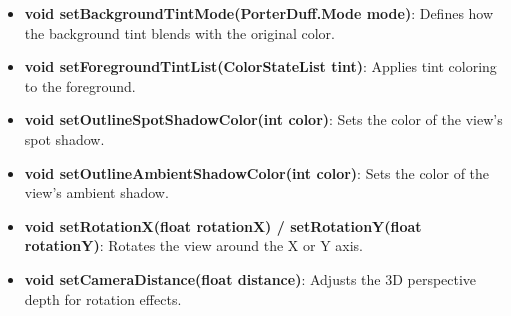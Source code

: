 \documentclass{report}
\begin{document}
\begin{itemize}
\begin{itemize}
        \item \textbf{void setBackgroundTintMode(PorterDuff.Mode mode)}: Defines how the background tint blends with the original color.
        \item \textbf{void setForegroundTintList(ColorStateList tint)}: Applies tint coloring to the foreground.
        \item \textbf{void setOutlineSpotShadowColor(int color)}: Sets the color of the view’s spot shadow.
        \item \textbf{void setOutlineAmbientShadowColor(int color)}: Sets the color of the view’s ambient shadow.
        \item \textbf{void setRotationX(float rotationX) / setRotationY(float rotationY)}: Rotates the view around the X or Y axis.
        \item \textbf{void setCameraDistance(float distance)}: Adjusts the 3D perspective depth for rotation effects.
    \end{itemize}

    \pagebreak 

\end{itemize}
\end{document}
